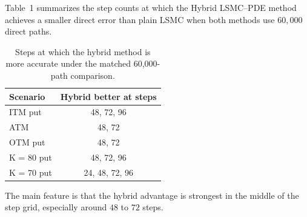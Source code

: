 \documentclass[11pt,a4paper]{article}
\begin{document}
Table~1 summarizes the step counts at which the Hybrid LSMC--PDE method achieves a smaller direct error than plain LSMC when both methods use \(60{,}000\) direct paths.

\begin{table}[h!]
\centering
\caption{Steps at which the hybrid method is more accurate under the matched 60,000-path comparison.}
\begin{tabular}{lc}
\toprule
Scenario & Hybrid better at steps \\
\midrule
ITM put & 48, 72, 96 \\
ATM & 48, 72 \\
OTM put & 48, 72 \\
K = 80 put & 48, 72, 96 \\
K = 70 put & 24, 48, 72, 96 \\
\bottomrule
\end{tabular}
\end{table}

The main feature is that the hybrid advantage is strongest in the middle of the step grid, especially around \(48\) to \(72\) steps.
\end{document}
